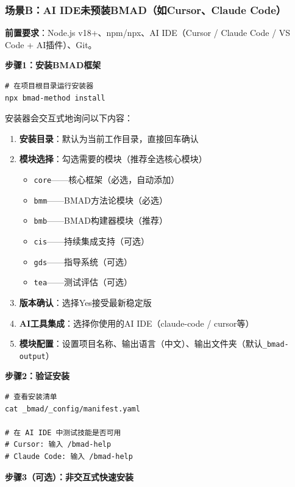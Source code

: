 \subsubsection*{场景B：AI IDE未预装BMAD（如Cursor、Claude Code）}

\textbf{前置要求}：Node.js v18+、npm/npx、AI IDE（Cursor / Claude Code / VS Code + AI插件）、Git。

\textbf{步骤1：安装BMAD框架}

\begin{lstlisting}[style=shell]
# 在项目根目录运行安装器
npx bmad-method install
\end{lstlisting}

安装器会交互式地询问以下内容：

\begin{enumerate}[leftmargin=2em]
  \item \textbf{安装目录}：默认为当前工作目录，直接回车确认
  \item \textbf{模块选择}：勾选需要的模块（推荐全选核心模块）
  \begin{itemize}
    \item \texttt{core}——核心框架（必选，自动添加）
    \item \texttt{bmm}——BMAD方法论模块（必选）
    \item \texttt{bmb}——BMAD构建器模块（推荐）
    \item \texttt{cis}——持续集成支持（可选）
    \item \texttt{gds}——指导系统（可选）
    \item \texttt{tea}——测试评估（可选）
  \end{itemize}
  \item \textbf{版本确认}：选择Yes接受最新稳定版
  \item \textbf{AI工具集成}：选择你使用的AI IDE（claude-code / cursor等）
  \item \textbf{模块配置}：设置项目名称、输出语言（中文）、输出文件夹（默认\texttt{\_bmad-output}）
\end{enumerate}

\textbf{步骤2：验证安装}

\begin{lstlisting}[style=shell]
# 查看安装清单
cat _bmad/_config/manifest.yaml

# 在 AI IDE 中测试技能是否可用
# Cursor: 输入 /bmad-help
# Claude Code: 输入 /bmad-help
\end{lstlisting}

\textbf{步骤3（可选）：非交互式快速安装}


